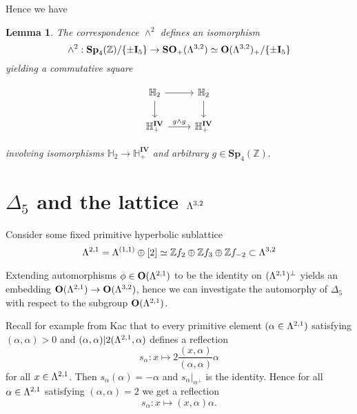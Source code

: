 \documentclass[9pt]{amsart} \usepackage[utf8]{inputenc}
\newtheorem{lemma}{Lemma}
\newcommand{\Z}{\mathbb{Z}} \newcommand{\C}{\mathbb{C}}
\newcommand{\HypPlan}{\Lambda^{(1,1)}}
\newcommand{\Sp}{\mathbf{Sp}}
\newcommand{\Orth}{\mathbf{O}}
\newcommand{\SO}{\mathbf{SO}}
\newcommand{\Hpl}{\mathbb{H}}
\newcommand{\IV}{\mathbf{IV}}
\newcommand{\Id}{\mathbf{I}}
\begin{document}
Hence we have

\begin{lemma}
The correspondence $\wedge^2$ defines an isomorphism $$\wedge^2 :
\Sp_4(\Z)/\{\pm \Id_5\} \rightarrow \SO_+(\La^{3,2}) \simeq
\Orth(\La^{3,2})_+/\{\pm\Id_5\}$$ yielding a commutative square

  \[ \begin{tikzcd}
\Hpl_2 \arrow{r}{} \arrow[swap]{d}{} & \Hpl_2 \arrow{d}{} \\%
\Hpl_+^{\IV} \arrow{r}{g \wedge g}& \Hpl_+^{\IV}
\end{tikzcd}
\]


involving isomorphisms $\Hpl_2 \rightarrow \Hpl_+^{\IV}$ and arbitrary
$g \in \Sp_4(\Z).$

\end{lemma}

\section{$\Delta_5$ and the lattice $\Lambda^{3,2}$}

Consider some fixed primitive hyperbolic sublattice
$$\La^{2,1} = \HypPlan \oplus [2] \simeq \Z f_2 \oplus \Z f_3 \oplus \Z
f_{-2} \subset \La^{3,2}$$

Extending automorphisms $\phi \in \Orth(\La^{2,1})$ to be the identity
on $(\Lambda^{2,1})^{\perp}$ yields an embedding $\Orth(\La^{2,1})
\rightarrow \Orth(\La^{3,2})$, hence we can investigate the automorphy
of $\Delta_5$ with respect to the subgroup $\Orth(\La^{2,1})$.


Recall for example from Kac \cite{KAC:1} that to every primitive element $(\alpha \in
\Lambda^{2,1})$ satisfying $(\alpha,\alpha) > 0$ and $(\alpha, \alpha) |
2(\Lambda^{2,1}, \alpha)$ defines a reflection $$s_{\alpha}: x \mapsto
2\frac{(x,\alpha)}{(\alpha, \alpha)}\alpha$$ for all $x \in \Lambda^{2,1}$. Then
$s_{\alpha}(\alpha) = -\alpha$ and $s_{\alpha}|_{\alpha^{\perp}}$ is the
identity. Hence for all $\alpha \in \Lambda^{2,1}$ satisfying
$(\alpha,\alpha) = 2$ we get a reflection $$s_{\alpha}: x \mapsto
(x,\alpha)\alpha.$$
\end{document}

